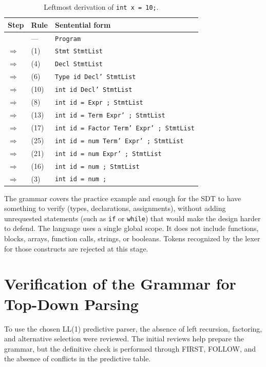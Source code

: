 \documentclass[12pt,letterpaper]{article}
\newcommand{\cod}[1]{\texttt{#1}} %
\newcommand{\anchotabla}{0.9\textwidth} %
\begin{document}
\begin{table}[H]
\centering
\renewcommand{\arraystretch}{1.1}
\begin{tabular}{@{}p{0.10\dimexpr\anchotabla} p{0.08\dimexpr\anchotabla} p{0.78\dimexpr\anchotabla}@{}}
\toprule
\textbf{Step} & \textbf{Rule} & \textbf{Sentential form} \\
\midrule
      & ---  & \cod{Program} \\
$\Rightarrow$ & (1)  & \cod{Stmt StmtList} \\
$\Rightarrow$ & (4)  & \cod{Decl StmtList} \\
$\Rightarrow$ & (6)  & \cod{Type id Decl' StmtList} \\
$\Rightarrow$ & (10) & \cod{int id Decl' StmtList} \\
$\Rightarrow$ & (8)  & \cod{int id = Expr ; StmtList} \\
$\Rightarrow$ & (13) & \cod{int id = Term Expr' ; StmtList} \\
$\Rightarrow$ & (17) & \cod{int id = Factor Term' Expr' ; StmtList} \\
$\Rightarrow$ & (25) & \cod{int id = num Term' Expr' ; StmtList} \\
$\Rightarrow$ & (21) & \cod{int id = num Expr' ; StmtList} \\
$\Rightarrow$ & (16) & \cod{int id = num ; StmtList} \\
$\Rightarrow$ & (3)  & \cod{int id = num ;} \\
\bottomrule
\end{tabular}
\caption{Leftmost derivation of \texttt{int x = 10;}.}\label{tab:derivation}
\end{table}

The grammar covers the practice example and enough for the SDT to have something to verify (types, declarations, assignments), without adding unrequested statements (such as \texttt{if} or \texttt{while}) that would make the design harder to defend. The language uses a single global scope. It does not include functions, blocks, arrays, function calls, strings, or booleans. Tokens recognized by the lexer for those constructs are rejected at this stage.

\section{Verification of the Grammar for Top-Down Parsing}
To use the chosen LL(1) predictive parser, the absence of left recursion, factoring, and alternative selection were reviewed. The initial reviews help prepare the grammar, but the definitive check is performed through FIRST, FOLLOW, and the absence of conflicts in the predictive table.
\end{document}
